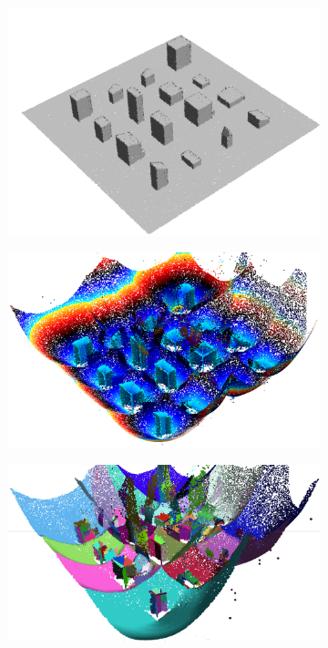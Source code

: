 \begin{figure}
	\begin{subfigure}[t]{0.45\linewidth}
		\includegraphics[width=\linewidth]{figs/smat/smat_r3d_surface.png}
		\label{fig:smat_r3d_surface}
	\end{subfigure}
	\quad
	\begin{subfigure}[t]{0.45\linewidth}
		\includegraphics[width=\linewidth]{figs/smat/smat_r3d_mat.png}
		\label{fig:smat_r3d_mat}
	\end{subfigure}
	\quad
	\begin{subfigure}[t]{0.45\linewidth}
		\includegraphics[width=\linewidth]{figs/smat/smat_r3d_thetad_all.png}

\end{subfigure}
\end{figure}

